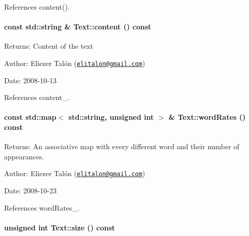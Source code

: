 References content().\hypertarget{class_text_8b6ac381338c5b3f719600b5f9be222c}{
\paragraph[content]{\setlength{\rightskip}{0pt plus 5cm}const std::string \& Text::content () const}\hfill}
\label{class_text_8b6ac381338c5b3f719600b5f9be222c}


\begin{Desc}
\item[Returns:]Content of the text\end{Desc}
\begin{Desc}
\item[Author:]Eliezer Talón (\href{mailto:elitalon@gmail.com}{\tt elitalon@gmail.com}) \end{Desc}
\begin{Desc}
\item[Date:]2008-10-13 \end{Desc}


References content\_\-.\hypertarget{class_text_f1588ae161a4c4894b2ce1a1d29ebc22}{
\paragraph[wordRates]{\setlength{\rightskip}{0pt plus 5cm}const std::map$<$ std::string, unsigned int $>$ \& Text::wordRates () const}\hfill}
\label{class_text_f1588ae161a4c4894b2ce1a1d29ebc22}


\begin{Desc}
\item[Returns:]An associative map with every different word and their number of appearances.\end{Desc}
\begin{Desc}
\item[Author:]Eliezer Talón (\href{mailto:elitalon@gmail.com}{\tt elitalon@gmail.com}) \end{Desc}
\begin{Desc}
\item[Date:]2008-10-23 \end{Desc}


References wordRates\_\-.\hypertarget{class_text_b66729ba84c2698ed888f641b3838a8b}{
\paragraph[size]{\setlength{\rightskip}{0pt plus 5cm}unsigned int Text::size () const}\hfill}
\label{class_text_b66729ba84c2698ed888f641b3838a8b}


